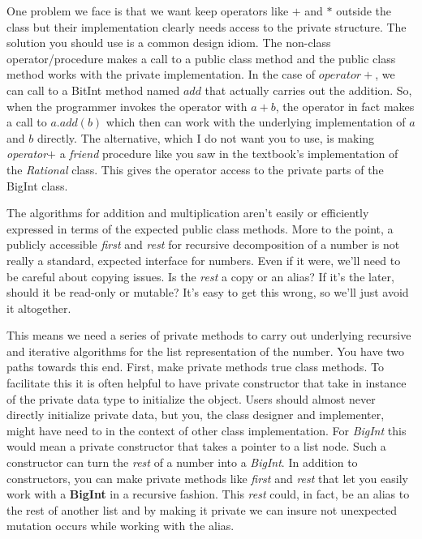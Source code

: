 \documentclass[10pt]{article}
\begin{document}
One problem we face is that we want keep operators like $+$ and $*$ outside the class but their implementation clearly needs access to the private structure. The solution you should use is a common design idiom. The non-class operator/procedure makes a call to a public class method and the public class method works with the private implementation. In the case of $operator+$, we can call to a BitInt method named $add$ that actually carries out the addition. So, when the programmer invokes the operator with $a + b$, the operator in fact makes a call to $a.add(b)$ which then can work with the underlying implementation of $a$ and $b$ directly.  The alternative, which I do not want you to use, is making \textit{operator$+$} a \textit{friend} procedure like you saw in the textbook's implementation of the \textit{Rational} class. This gives the operator access to the private parts of the BigInt class. 

The algorithms for addition and multiplication aren't easily or efficiently expressed in terms of the expected public class methods. More to the point, a publicly accessible \textit{first} and \textit{rest} for recursive decomposition of a number is not really a standard, expected interface for numbers. Even if it were, we'll need to be careful about copying issues.  Is the \textit{rest} a copy or an alias? If it's the later, should it be read-only or mutable? It's easy to get this wrong, so we'll just avoid it altogether. 

This means we need a series of private methods to carry out underlying recursive and iterative algorithms for the list representation of the number. You have two paths towards this end. First, make private methods true class methods.  To facilitate this it is often helpful to have private constructor that take in instance of the private data type to initialize the object. Users should almost never directly initialize private data, but you, the class designer and implementer, might have need to in the context of other class implementation. For \textit{BigInt} this would mean a private constructor that takes a pointer to a list node. Such a constructor can turn the \textit{rest} of a number into a \textit{BigInt}. In addition to constructors, you can make private methods like \textit{first} and \textit{rest} that let you easily work with a \textbf{BigInt} in a recursive fashion. This \textit{rest} could, in fact, be an alias to the rest of another list and by making it private we can insure not unexpected mutation occurs while working with the alias. 
\end{document}
